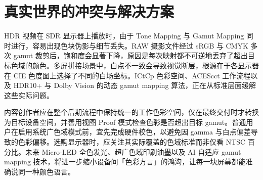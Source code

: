 \chapter{真实世界的冲突与解决方案}
HDR 视频在 SDR 显示器上播放时，由于 Tone Mapping 与 Gamut Mapping 同时进行，容易出现色块伪影与细节丢失。RAW 摄影文件经过 sRGB 与 CMYK 多次 gamut 裁剪后，饱和度会显著下降，原因是每次映射都不可逆地丢弃了超出目标色域的颜色。多屏拼接场景中，白点不一致会导致视觉断层，根源在于各显示器在 CIE 色度图上选择了不同的白场坐标。ICtCp 色彩空间、ACEScct 工作流程以及 HDR10+ 与 Dolby Vision 的动态 gamut mapping 算法，正在从标准层面缓解这些实际问题。\par
内容创作者应在整个后期流程中保持统一的工作色彩空间，仅在最终交付时才转换为目标设备空间，并善用视图 Proof 模式检查色彩是否超出目标 gamut。普通用户在启用系统广色域模式前，宜先完成硬件校色，以避免因 gamma 与白点偏差导致的色彩偏移。选购显示器时，应关注其实际覆盖的色域标准而非仅看 NTSC 百分比。未来 Micro-LED 全色发光、超广色域印刷油墨以及 AI 自适应 gamut mapping 技术，将进一步缩小设备间「色彩方言」的鸿沟，让每一块屏幕都能准确说同一种颜色语言。\par
